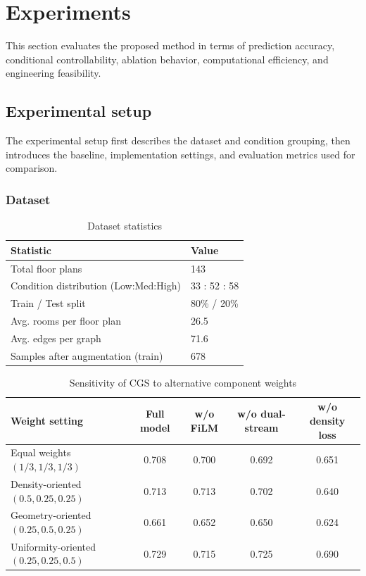 \section{Experiments}
\label{sec:experiments}

This section evaluates the proposed method in terms of prediction accuracy, conditional controllability, ablation behavior, computational efficiency, and engineering feasibility.

\subsection{Experimental setup}
\label{subsec:exp_setup}

The experimental setup first describes the dataset and condition grouping, then introduces the baseline, implementation settings, and evaluation metrics used for comparison.

\subsubsection{Dataset}
\label{subsubsec:dataset}

\begin{table}[t]
\centering
\caption{Dataset statistics}
\label{tab:dataset_stats}
\begin{tabularx}{\columnwidth}{lX}
\toprule
Statistic & Value \\
\midrule
Total floor plans & 143 \\
Condition distribution (Low:Med:High) & 33 : 52 : 58 \\
Train / Test split & 80\% / 20\% \\
Avg. rooms per floor plan & 26.5 \\
Avg. edges per graph & 71.6 \\
Samples after augmentation (train) & 678 \\
\bottomrule
\end{tabularx}
\end{table}


\begin{table}[t]
\centering
\caption{Sensitivity of CGS to alternative component weights}
\label{tab:cgs_sensitivity}
\begin{tabular*}{\textwidth}{@{\extracolsep{\fill}}lcccc@{}}
\toprule
Weight setting & Full model & w/o FiLM & w/o dual-stream & w/o density loss \\
\midrule
Equal weights $(1/3,1/3,1/3)$ & 0.708 & 0.700 & 0.692 & 0.651 \\
Density-oriented $(0.5,0.25,0.25)$ & 0.713 & 0.713 & 0.702 & 0.640 \\
Geometry-oriented $(0.25,0.5,0.25)$ & 0.661 & 0.652 & 0.650 & 0.624 \\
Uniformity-oriented $(0.25,0.25,0.5)$ & 0.729 & 0.715 & 0.725 & 0.690 \\
\bottomrule
\end{tabular*}
\end{table}


